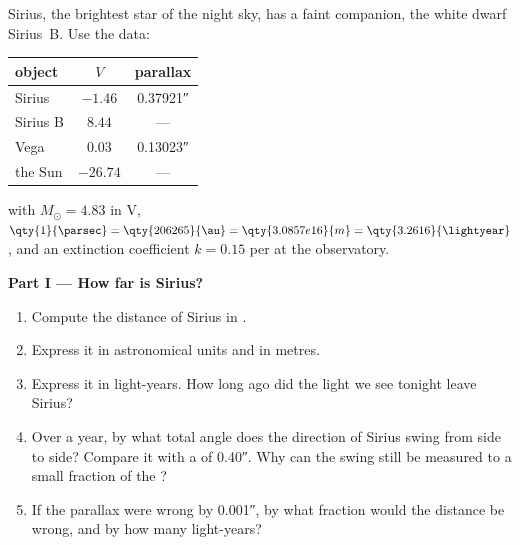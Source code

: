 \begin{problem}
\label{pb:b1:observing-the-sky:1}
Sirius, the brightest star of the night sky, has a faint companion, the
white dwarf Sirius~B. Use the data:
\begin{center}
\small
\begin{tabular}{lcc}
\hline
object & $V$ & parallax \\
\hline
Sirius & $-1.46$ & \ang{;;0.37921} \\
Sirius B & $8.44$ & --- \\
Vega & $0.03$ & \ang{;;0.13023} \\
the Sun & $-26.74$ & --- \\
\hline
\end{tabular}
\end{center}
with $M_\odot = 4.83$ in V, $\qty{1}{\parsec} = \qty{206265}{\au} =
\qty{3.0857e16}{m} = \qty{3.2616}{\lightyear}$, and an extinction
coefficient $k = 0.15$ per  at the observatory.

\medskip
\noindent\textbf{Part I --- How far is Sirius?}
\begin{enumerate}
  \item Compute the distance of Sirius in .
  \item Express it in astronomical units and in metres.
  \item Express it in light-years. How long ago did the light we see
        tonight leave Sirius?
  \item Over a year, by what total angle does the direction of Sirius
        swing from side to side? Compare it with a  of \ang{;;0.40}.
        Why can the swing still be measured to a small fraction of the
        ?
  \item If the parallax were wrong by \ang{;;0.001}, by what fraction would
        the distance be wrong, and by how many light-years?
\end{enumerate}


\end{problem}
